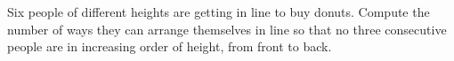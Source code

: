 Six people of different heights are getting in line to buy donuts. Compute the number of ways they can arrange themselves in line so that no three consecutive people are in increasing order of height, from front to back.
